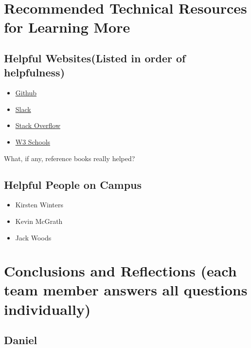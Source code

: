 \documentclass[journal,10pt,onecolumn,compsoc]{IEEEtran}
\begin{document}
    \section{Recommended Technical Resources for Learning More}
    \subsection{Helpful Websites(Listed in order of helpfulness)}
	\begin{itemize}
    \item \href{https://github.com/}{Github}
    \item \href{https://slack.com/}{Slack}
    \item \href{https://stackoverflow.com/}{Stack Overflow}
	\item \href{https://www.w3schools.com/}{W3 Schools}
    \end{itemize}
    What, if any, reference books really helped?
    \subsection{Helpful People on Campus}
	\begin{itemize}
    \item Kirsten Winters
    \item Kevin McGrath
    \item Jack Woods
    \end{itemize}
    \section{Conclusions and Reflections (each team member answers all questions individually)}
    \subsection{Daniel}
\end{document}

